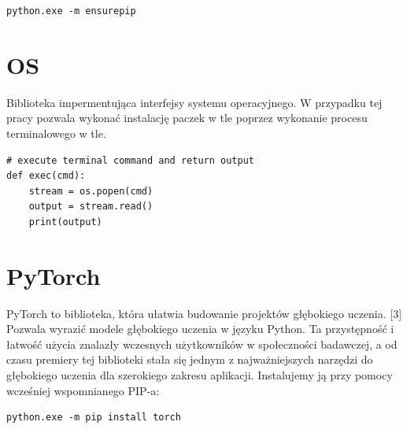 \documentclass[openright]{xmgr}
\begin{document}
\begin{lstlisting}
python.exe -m ensurepip
\end{lstlisting}

\section{OS\label{s:dsssl}}
        
  \indent \indent Biblioteka impermentująca interfejsy systemu operacyjnego. W przypadku tej pracy pozwala wykonać instalację paczek w tle poprzez wykonanie procesu terminalowego w tle. 


\begin{lstlisting}
# execute terminal command and return output
def exec(cmd):
    stream = os.popen(cmd)
    output = stream.read()
    print(output)
\end{lstlisting}


 
\section{PyTorch\label{s:dsssl}}
    
    
\indent \indent PyTorch to biblioteka, która ułatwia budowanie projektów głębokiego uczenia. [3] Pozwala wyrazić modele głębokiego uczenia w języku Python. Ta przystępność i łatwość użycia znalazły wczesnych użytkowników w społeczności badawczej, a od czasu premiery tej biblioteki stała się jednym z najważniejszych narzędzi do głębokiego uczenia dla szerokiego zakresu aplikacji. Instalujemy ją przy pomocy wcześniej wspomnianego PIP-a:

\begin{lstlisting}
python.exe -m pip install torch
\end{lstlisting}
\end{document}
